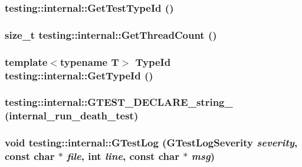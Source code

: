 \subsubsection{ testing::internal::GetTestTypeId ()}\label{namespacetesting_1_1internal_618463a60211a8e13bf0478f1219cd4e}


\subsubsection{\setlength{\rightskip}{0pt plus 5cm}size\_\-t testing::internal::GetThreadCount ()\hspace{0.3cm}{\tt  [inline]}}\label{namespacetesting_1_1internal_c799629c5b4f10c969a44db23e620a3d}


\subsubsection{\setlength{\rightskip}{0pt plus 5cm}template$<$typename T$>$ {\bf TypeId} testing::internal::GetTypeId ()\hspace{0.3cm}{\tt  [inline]}}\label{namespacetesting_1_1internal_931b4abea2beb1bd7d50bde8ccd934c5}


\subsubsection{\setlength{\rightskip}{0pt plus 5cm}testing::internal::GTEST\_\-DECLARE\_\-string\_\- (internal\_\-run\_\-death\_\-test)}\label{namespacetesting_1_1internal_bc5bc24089267eafbf506fe075348d74}


\subsubsection{\setlength{\rightskip}{0pt plus 5cm}void testing::internal::GTestLog (GTestLogSeverity {\em severity}, const char $\ast$ {\em file}, int {\em line}, const char $\ast$ {\em msg})}\label{namespacetesting_1_1internal_d7bcc47e4c219390bd3135920ca0ae0b}


